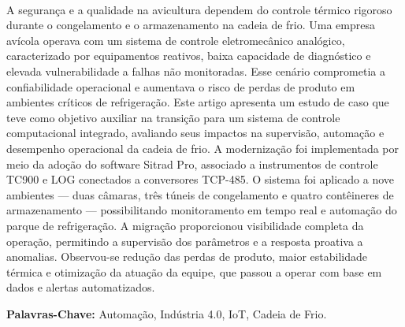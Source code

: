\documentclass[12pt]{article}
\begin{document}
\begin{resumo} 

A segurança e a qualidade na avicultura dependem do controle térmico rigoroso durante o congelamento e o armazenamento na cadeia de frio.  Uma empresa avícola operava com um sistema de controle eletromecânico analógico, caracterizado por equipamentos reativos, baixa capacidade de diagnóstico e elevada vulnerabilidade a falhas não monitoradas. Esse cenário comprometia a confiabilidade operacional e aumentava o risco de perdas de produto em ambientes críticos de refrigeração. Este artigo apresenta um estudo de caso que teve como objetivo auxiliar na transição para um sistema de controle computacional integrado, avaliando seus impactos na supervisão, automação e desempenho operacional da cadeia de frio. A modernização foi implementada por meio da adoção do software Sitrad Pro, associado a instrumentos de controle TC900 e LOG conectados a conversores TCP-485. O sistema foi aplicado a nove ambientes — duas câmaras, três túneis de congelamento e quatro contêineres de armazenamento — possibilitando monitoramento em tempo real e automação do parque de refrigeração. A migração proporcionou visibilidade completa da operação, permitindo a supervisão dos parâmetros e a resposta proativa a anomalias. Observou-se redução das perdas de produto, maior estabilidade térmica e otimização da atuação da equipe, que passou a operar com base em dados e alertas automatizados.

\textbf{Palavras-Chave:} Automação, Indústria 4.0, IoT, Cadeia de Frio.

\end{resumo}
\end{document}

